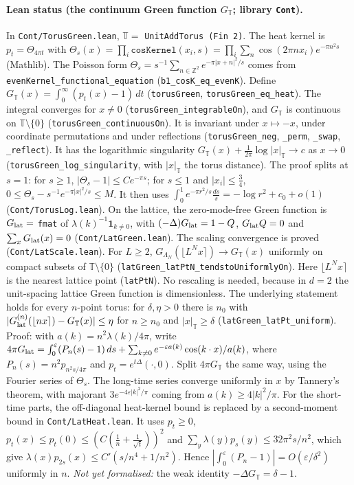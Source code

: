 \documentclass[11pt]{amsart}
\theoremstyle{definition}
\theoremstyle{remark}
\numberwithin{equation}{section}
\newcommand{\Z}{\mathbb{Z}}
\newcommand{\T}{\mathbb{T}}
\begin{document}
\paragraph{Lean status (the continuum Green function $G_\T$; library \texttt{Cont}).}
In \texttt{Cont/TorusGreen.lean}, $\T=$ \texttt{UnitAddTorus (Fin 2)}. The heat kernel is
$p_t=\Theta_{4\pi t}$ with $\Theta_s(x)=\prod_i\texttt{cosKernel}(x_i,s)
=\prod_i\sum_{n}\cos(2\pi nx_i)e^{-\pi n^2s}$ (Mathlib). The Poisson form
$\Theta_s=s^{-1}\sum_{n\in\Z^2}e^{-\pi|x+n|^2/s}$ comes from \texttt{evenKernel\_functional\_equation}
(\texttt{b1\_cosK\_eq\_evenK}). Define
$G_\T(x)=\int_0^\infty(p_t(x)-1)\,dt$ (\texttt{torusGreen}, \texttt{torusGreen\_eq\_heat}).
The integral converges for $x\ne0$ (\texttt{torusGreen\_integrableOn}), and $G_\T$ is continuous on
$\T\setminus\{0\}$ (\texttt{torusGreen\_continuousOn}). It is invariant under $x\mapsto-x$, under
coordinate permutations and under reflections (\texttt{torusGreen\_neg}, \texttt{\_perm},
\texttt{\_swap}, \texttt{\_reflect}). It has the logarithmic singularity
$G_\T(x)+\frac1{2\pi}\log|x|_\T\to c$ as $x\to0$ (\texttt{torusGreen\_log\_singularity}, with
$|x|_\T$ the torus distance). The proof splits at $s=1$: for $s\ge1$, $|\Theta_s-1|\le Ce^{-\pi s}$;
for $s\le1$ and $|x_i|\le\frac34$, $0\le\Theta_s-s^{-1}e^{-\pi|x|^2/s}\le M$. It then uses
$\int_0^1e^{-\pi r^2/s}\frac{ds}s=-\log r^2+c_0+o(1)$ (\texttt{Cont/TorusLog.lean}).
On the lattice, the zero-mode-free Green function is $G_{\rm lat}=$ \texttt{fmat} of
$\lambda(k)^{-1}\mathbf 1_{k\ne0}$, with $(-\Delta)G_{\rm lat}=1-Q$, $G_{\rm lat}Q=0$ and
$\sum_xG_{\rm lat}(x)=0$ (\texttt{Cont/LatGreen.lean}).
The scaling convergence is proved (\texttt{Cont/LatScale.lean}). For $L\ge2$,
$G_{\Lambda_N}(\lfloor L^Nx\rceil)\to G_\T(x)$ uniformly on compact subsets of $\T\setminus\{0\}$
(\texttt{latGreen\_latPtN\_tendstoUniformlyOn}). Here $\lfloor L^Nx\rceil$ is the nearest lattice
point (\texttt{latPtN}). No rescaling is needed, because in $d=2$ the unit-spacing lattice Green
function is dimensionless. The underlying statement holds for every $n$-point torus: for
$\delta,\eta>0$ there is $n_0$ with $|G^{(n)}_{\rm lat}(\lfloor nx\rceil)-G_\T(x)|\le\eta$ for
$n\ge n_0$ and $|x|_\T\ge\delta$ (\texttt{latGreen\_latPt\_uniform}). Proof: with
$a(k)=n^2\lambda(k)/4\pi$, write $4\pi G_{\rm lat}=\int_0^\varepsilon(P_n(s)-1)\,ds+\sum_{k\ne0}
e^{-\varepsilon a(k)}\cos(k\cdot x)/a(k)$, where $P_n(s)=n^2p_{n^2s/4\pi}$ and $p_t=e^{t\Delta}(\cdot,0)$. Split $4\pi G_\T$ the same way, using the Fourier
series of $\Theta_s$. The long-time series converge uniformly in $x$ by Tannery's theorem, with
majorant $3e^{-4\varepsilon|k|^2/\pi}$ coming from $a(k)\ge4|k|^2/\pi$. For the short-time parts,
the off-diagonal heat-kernel bound is replaced by a second-moment bound in
\texttt{Cont/LatHeat.lean}. It uses $p_t\ge0$, $p_t(x)\le p_t(0)\le(C(\frac1n+\frac1{\sqrt t}))^2$
and $\sum_y\lambda(y)p_s(y)\le32\pi^2s/n^2$, which give
$\lambda(x)p_{2s}(x)\le C'(s/n^4+1/n^2)$. Hence
$|\int_0^\varepsilon(P_n-1)|=O(\varepsilon/\delta^2)$ uniformly in $n$.
\emph{Not yet formalised:} the weak identity $-\Delta G_\T=\delta-1$.
\end{document}
